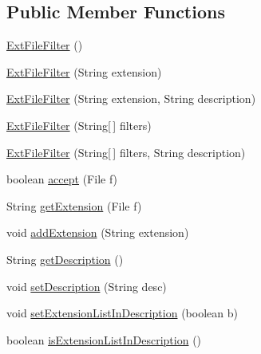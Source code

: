 \subsection*{Public Member Functions}
\begin{DoxyCompactItemize}
\item 
\hyperlink{classorg_1_1tzi_1_1use_1_1gui_1_1util_1_1_ext_file_filter_a4dbc3d57c69d7d35f4ed4c3cb30523c4}{Ext\-File\-Filter} ()
\item 
\hyperlink{classorg_1_1tzi_1_1use_1_1gui_1_1util_1_1_ext_file_filter_a0c3c3572721f99dea2ae2839b398522c}{Ext\-File\-Filter} (String extension)
\item 
\hyperlink{classorg_1_1tzi_1_1use_1_1gui_1_1util_1_1_ext_file_filter_a17090ae625f1356453f7675e3be3c888}{Ext\-File\-Filter} (String extension, String description)
\item 
\hyperlink{classorg_1_1tzi_1_1use_1_1gui_1_1util_1_1_ext_file_filter_af71d3e054db1481174c412e631cf0aad}{Ext\-File\-Filter} (String\mbox{[}$\,$\mbox{]} filters)
\item 
\hyperlink{classorg_1_1tzi_1_1use_1_1gui_1_1util_1_1_ext_file_filter_a2662ba75f476be0b8184e8e55dda69f1}{Ext\-File\-Filter} (String\mbox{[}$\,$\mbox{]} filters, String description)
\item 
boolean \hyperlink{classorg_1_1tzi_1_1use_1_1gui_1_1util_1_1_ext_file_filter_ae5be0a7e4541506010fe93ccbf8f34f0}{accept} (File f)
\item 
String \hyperlink{classorg_1_1tzi_1_1use_1_1gui_1_1util_1_1_ext_file_filter_a2486128f3cc630f998ac6d970e995086}{get\-Extension} (File f)
\item 
void \hyperlink{classorg_1_1tzi_1_1use_1_1gui_1_1util_1_1_ext_file_filter_ac108ee0a2666dbffecdb41f9dfba046c}{add\-Extension} (String extension)
\item 
String \hyperlink{classorg_1_1tzi_1_1use_1_1gui_1_1util_1_1_ext_file_filter_af8d389b2e50591a85d351acdb634be72}{get\-Description} ()
\item 
void \hyperlink{classorg_1_1tzi_1_1use_1_1gui_1_1util_1_1_ext_file_filter_affbacea8033899b080805d1679192434}{set\-Description} (String desc)
\item 
void \hyperlink{classorg_1_1tzi_1_1use_1_1gui_1_1util_1_1_ext_file_filter_a5df0086cdafea94f4bf3051ee5db9a36}{set\-Extension\-List\-In\-Description} (boolean b)
\item 
boolean \hyperlink{classorg_1_1tzi_1_1use_1_1gui_1_1util_1_1_ext_file_filter_a36898289b5b78fc6eea5cb219be4edcb}{is\-Extension\-List\-In\-Description} ()
\end{DoxyCompactItemize}



